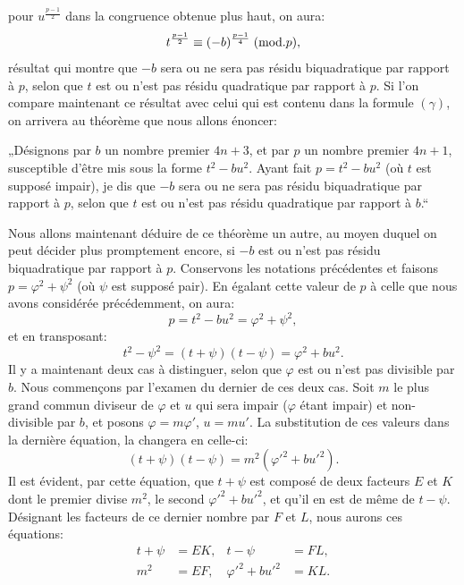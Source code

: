 \noindent
pour $u^{\frac{p-1}{2}}$ dans la congruence obtenue plus haut, on aura:
\[
t^{\frac{p-1}{2}}\equiv(-b)^{\frac{p-1}{4}}\;(\mathrm{mod}.p),
\]
résultat qui montre que $-b$ sera ou ne sera pas résidu biquadratique par
rapport à $p$, selon que $t$ est ou n'est pas résidu quadratique par rapport à $p$.
Si l'on compare maintenant ce résultat avec celui qui est contenu dans la formule
$(\gamma)$, on arrivera au théorème que nous allons énoncer:
\par\indent
„Désignons par $b$ un nombre premier $4n+3$, et par $p$ un nombre
premier $4n+1$, susceptible d'être mis sous la forme $t^2-bu^2$. Ayant fait
$p=t^2-bu^2$ (où $t$ est supposé impair), je dis que $-b$ sera ou ne sera pas
résidu biquadratique par rapport à $p$, selon que $t$ est ou n'est pas résidu quadratique
par rapport à $b$.“
\par\indent
Nous allons maintenant déduire de ce théorème un autre, au moyen
duquel on peut décider plus promptement encore, si $-b$ est ou n'est pas résidu
biquadratique par rapport à $p$. Conservons les notations précédentes et
faisons $p=\varphi^2+\psi^2$ (où $\psi$ est supposé pair). En égalant cette valeur de $p$
à celle que nous avons considérée précédemment, on aura:
\[
p=t^2-bu^2=\varphi^2+\psi^2,
\]
et en transposant:
\[
t^2-\psi^2=(t+\psi)(t-\psi)=\varphi^2+bu^2.
\]
Il y a maintenant deux cas à distinguer, selon que $\varphi$ est ou n'est pas divisible
par $b$. Nous commençons par l'examen du dernier de ces deux cas. Soit
$m$ le plus grand commun diviseur de $\varphi$ et $u$ qui sera impair ($\varphi$ étant impair)
et non-divisible par $b$, et posons $\varphi=m\varphi'$, $u=mu'$. La substitution de ces
valeurs dans la dernière équation, la changera en celle-ci:
\[
(t+\psi)(t-\psi)=m^2(\varphi'^2+bu'^2).
\]
Il est évident, par cette équation, que $t+\psi$ est composé de deux facteurs $E$
et $K$ dont le premier divise $m^2$, le second $\varphi'^2+bu'^2$, et qu'il en est de même
de $t-\psi$. Désignant les facteurs de ce dernier nombre par $F$ et $L$, nous
aurons ces équations:
\[
\begin{aligned}
t+\psi&=EK, &t-\psi&=FL,\\
m^2&=EF, &\varphi'^2+bu'^2&=KL.
\end{aligned}
\]
